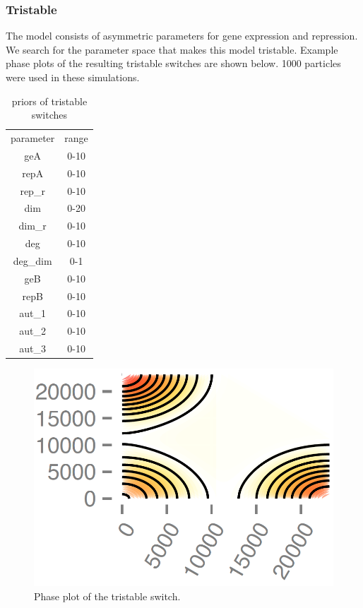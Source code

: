 \clearpage
\subsubsection{Tristable}
The model consists of asymmetric parameters for gene expression and repression. We search for the parameter space that makes this model tristable. Example phase plots of the resulting tristable switches are shown below. 1000 particles were used in these simulations.
 
 \begin{table}[htbp]
\centering
\caption{priors of tristable switches}
\label{tab:priors_tri}
\begin{tabular}{cc}
parameter & range \\
geA & 0-10 \\
repA & 0-10 \\
rep\_r & 0-10 \\
dim & 0-20 \\
dim\_r & 0-10 \\
deg & 0-10 \\
deg\_dim & 0-1 \\
geB & 0-10 \\
repB & 0-10 \\
aut\_1 & 0-10 \\
aut\_2 & 0-10 \\
aut\_3 & 0-10
\end{tabular}
\end{table}

\begin{figure}[h!]
\begin{center}
\includegraphics[scale=0.2]{chapterModelling/mass_action_stochastic_switches/tri_stoch_images/phase_plot_tri.png}
\caption{Phase plot of the tristable switch.}\label{fig_1}
\end{center}
\end{figure}

